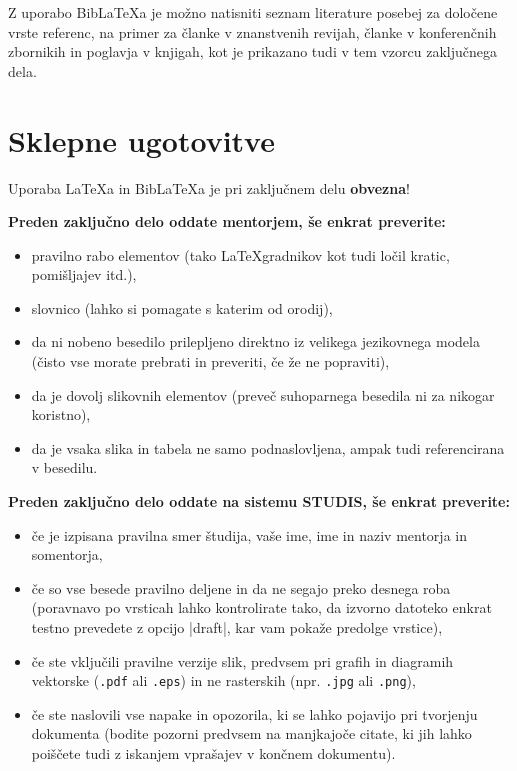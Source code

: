 \documentclass[9pt]{style/friteza}
\begin{document}
Z uporabo Bib\LaTeX{a} je možno natisniti seznam literature posebej za določene vrste referenc, na primer za članke v znanstvenih revijah, članke v konferenčnih zbornikih in poglavja v knjigah, kot je prikazano tudi v tem vzorcu zaključnega dela.
 

\section{Sklepne ugotovitve}

Uporaba \LaTeX{a} in Bib\LaTeX{a} je pri zaključnem delu \textbf{obvezna}!


\textbf{Preden zaključno delo oddate mentorjem, še enkrat preverite:}
\begin{itemize}
    \item pravilno rabo elementov (tako \LaTeX gradnikov kot tudi ločil kratic, pomišljajev itd.),
    \item slovnico (lahko si pomagate s katerim od orodij),
    \item da ni nobeno besedilo prilepljeno direktno iz velikega jezikovnega modela (čisto vse morate prebrati in preveriti, če že ne popraviti),
    \item da je dovolj slikovnih elementov (preveč suhoparnega besedila ni za nikogar koristno),
    \item da je vsaka slika in tabela ne samo podnaslovljena, ampak tudi referencirana v besedilu.
\end{itemize}

\textbf{Preden zaključno delo oddate na sistemu STUDIS, še enkrat preverite:}
\begin{itemize}
  \item če je izpisana pravilna smer študija, vaše ime, ime in naziv mentorja in somentorja,
  \item če so vse besede pravilno deljene in da ne segajo preko desnega roba (poravnavo po vrsticah lahko kontrolirate tako, da izvorno datoteko enkrat testno prevedete z opcijo \ltx|draft|, kar vam pokaže  predolge vrstice),
  \item če ste vključili pravilne verzije slik, predvsem pri grafih in diagramih vektorske ({\tt .pdf} ali {\tt .eps}) in ne rasterskih (npr. {\tt .jpg} ali {\tt .png}),
  \item če ste naslovili vse napake in opozorila, ki se lahko pojavijo pri tvorjenju dokumenta (bodite pozorni predvsem na manjkajoče citate, ki jih lahko poiščete tudi z iskanjem vprašajev v končnem dokumentu).
\end{itemize}
\end{document}
